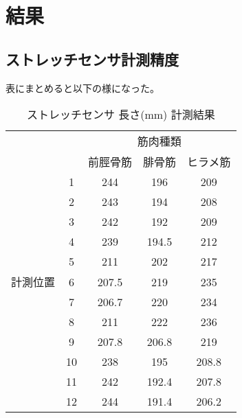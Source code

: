 \section{結果}
\subsection{ストレッチセンサ計測精度}
表にまとめると以下の様になった。
\begin{table}
    \caption{ストレッチセンサ 長さ(mm) 計測結果}
    \begin{center}
        \begin{tabular}{|c|c|ccc|}\hline
            \multicolumn{2}{|c|}{} & \multicolumn{3}{c|}{筋肉種類}\\
            \cline{3-5}
            \multicolumn{2}{|c|}{} & 前脛骨筋 & 腓骨筋 & ヒラメ筋 \\ \hline
            & 1 & 244 & 196 & 209 \\ \cline{2-5}
            & 2 & 243 & 194 & 208 \\ \cline{2-5}
            & 3 & 242 & 192 & 209 \\ \cline{2-5}
            & 4 & 239 & 194.5 & 212 \\ \cline{2-5}
            & 5 & 211 & 202 & 217 \\ \cline{2-5}
            計測位置 & 6 & 207.5 & 219 & 235 \\ \cline{2-5}
            & 7 & 206.7 & 220 & 234 \\ \cline{2-5}
            & 8 & 211 & 222 & 236 \\ \cline{2-5}
            & 9 & 207.8 & 206.8 & 219 \\ \cline{2-5}
            & 10 & 238 & 195 & 208.8 \\ \cline{2-5}
            & 11 & 242 & 192.4 & 207.8 \\ \cline{2-5}
            & 12 & 244 & 191.4 & 206.2 \\ \hline
        \end{tabular}
    \end{center}
\end{table}
